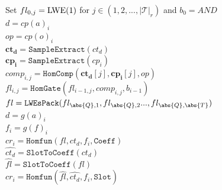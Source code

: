 
\begin{algorithm}[t!]
    \caption{Homomorphic Query Evaluation Algorithm}
    \label{algo: query_evaluation}
     Set $fl_{0,j} = {\rm LWE}(1)$ 
     for $j \in (1,2,...,\lvert \mathcal{T} \rvert_{r})$ and $b_0 = AND$\\
    {
        $d = cp(a)_i$  \\
        $op = cp(o)_i$  \\
        $\mathbf{ct_d} = \texttt{SampleExtract}(ct_{d})$ 
        \\
        $\mathbf{cp_i} = \texttt{SampleExtract}(cp_{i})$ \\
        {
            $comp_{i,j} = \texttt{HomComp}
            (\mathbf{ct_d}[j], \mathbf{cp_i}[j],op)$ \\
            $fl_{i,j} = \texttt{HomGate}(fl_{i-1, j}, comp_{i,j}, b_{i-1})$ \\
        }
    }
    $fl = \texttt{LWEsPack}(fl_{\abs{Q}, 1},fl_{\abs{Q}, 2}...,fl_{\abs{Q}, \abs{T}})$ \\
    {
        $d = g(a)_i$ \\
        $f_i = g(f)_i$ \\
        {
            $cr_i = \texttt{Homfun}(fl, ct_d, f_i, \texttt{Coeff})$ \\
        }
        {
            $\hat{ct_d} = \texttt{SlotToCoeff}(ct_d)$ \\
            $\hat{fl} = \texttt{SlotToCoeff}(fl)$ \\
            $cr_i = \texttt{Homfun}(\hat{fl}, \hat{ct_d}, f_i, \texttt{Slot})$ \\
        }
    }
\end{algorithm}



